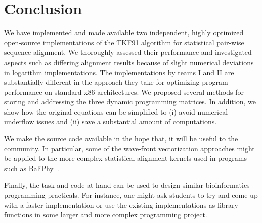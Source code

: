 \documentclass[runningheads,a4paper]{llncs}
\begin{document}
\section{Conclusion}
\label{conclusion}
We have implemented and made available two independent, highly optimized open-source implementations of the TKF91 algorithm for statistical pair-wise sequence alignment.
We thoroughly assessed their performance and investigated aspects such as differing alignment results because of slight numerical deviations in logarithm implementations.
The implementations by teams I and II are substantially different in the approach they take for optimizing program performance on standard x86 architectures. 
We proposed several methods for storing and addressing the three dynamic programming matrices. In addition, we show how the original equations can be simplified 
to (i) avoid numerical underflow issues and (ii) save a substantial amount of computations.

We make the source code available in the hope that, it will be useful to the community. 
In particular, some of the wave-front vectorization approaches might be applied to the more complex statistical alignment kernels used in programs 
such as BaliPhy~\cite{suchard2006bali}.

Finally, the task and code at hand can be used to design similar bioinformatics programming practicals. For instance, one might ask students to try and 
come up with a faster implementation or use the existing implementations as library functions in some larger and more complex programming project.









\end{document}
